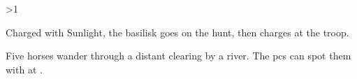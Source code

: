 \ifnum\value{temperature}>1

\basilisk
{}
Charged with Sunlight, the \gls{basilisk} goes on the hunt, then charges at the troop.

\else


Five horses wander through a distant clearing by a river.
The \glspl{pc} can spot them with  at \tn[10].

\fi
